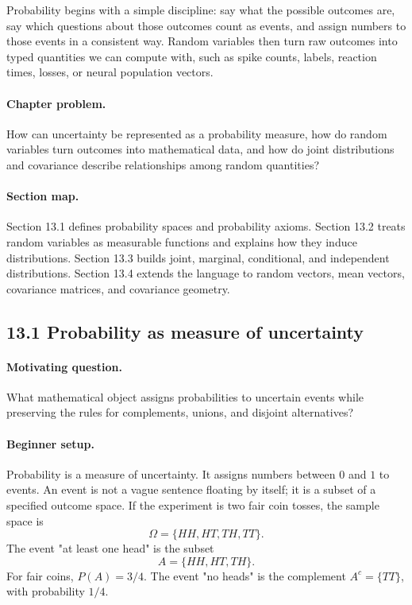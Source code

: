 Probability begins with a simple discipline: say what the possible outcomes are, say which questions about those outcomes count as events, and assign numbers to those events in a consistent way. Random variables then turn raw outcomes into typed quantities we can compute with, such as spike counts, labels, reaction times, losses, or neural population vectors.

\paragraph{Chapter problem.}
How can uncertainty be represented as a probability measure, how do random variables turn outcomes into mathematical data, and how do joint distributions and covariance describe relationships among random quantities?

\paragraph{Section map.}
Section 13.1 defines probability spaces and probability axioms. Section 13.2 treats random variables as measurable functions and explains how they induce distributions. Section 13.3 builds joint, marginal, conditional, and independent distributions. Section 13.4 extends the language to random vectors, mean vectors, covariance matrices, and covariance geometry.

\subsection{13.1 Probability as measure of uncertainty}

\paragraph{Motivating question.}
What mathematical object assigns probabilities to uncertain events while preserving the rules for complements, unions, and disjoint alternatives?

\paragraph{Beginner setup.}
Probability is a measure of uncertainty. It assigns numbers between \(0\) and \(1\) to events. An event is not a vague sentence floating by itself; it is a subset of a specified outcome space. If the experiment is two fair coin tosses, the sample space is
\[
\Omega=\{HH,HT,TH,TT\}.
\]
The event "at least one head" is the subset
\[
A=\{HH,HT,TH\}.
\]
For fair coins, \(P(A)=3/4\). The event "no heads" is the complement \(A^c=\{TT\}\), with probability \(1/4\).

